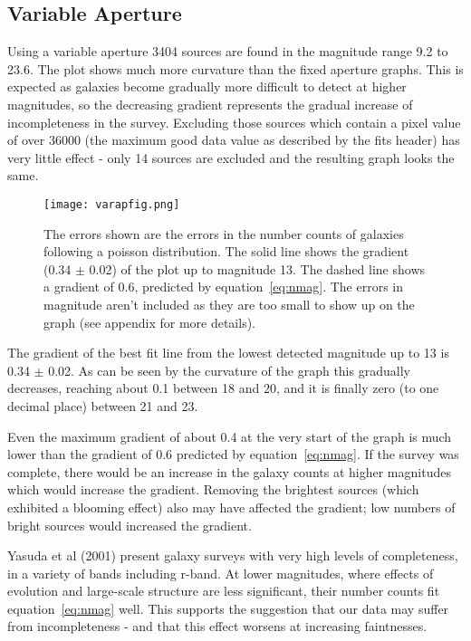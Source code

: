 \documentclass[a4paper,11pt,twoside]{article}
\begin{document}
\newpage
\subsection{Variable Aperture}

Using a variable aperture 3404 sources are found in the
magnitude range 9.2 to 23.6.
The plot shows much more curvature 
than the fixed aperture graphs. This is expected as galaxies 
become gradually more difficult to detect at higher magnitudes, 
so the decreasing gradient represents the gradual increase of 
incompleteness in the survey. Excluding those sources which 
contain a pixel value of over 36000 (the maximum good data 
value as described by the fits header) has very little 
effect - only 14 sources are excluded and the resulting graph 
looks the same.

\begin{figure}[htb]
  \centering
  \texttt{[image: varapfig.png]}
  \caption{The errors shown are the errors in the number 
counts of galaxies following a poisson distribution. The solid line
shows the gradient (0.34 \(\pm\) 0.02) of the plot up to 
magnitude 13. The dashed line shows a gradient of 0.6, 
predicted by equation~\ref{eq:nmag}. 
The errors in magnitude aren't included as 
they are too small to show up on the graph 
(see appendix for more details).}
  \label{fig:varapfig}
\end{figure}


The gradient of the best fit line from the lowest detected 
magnitude up to 13 is 0.34 \(\pm\) 0.02. 
As can be seen by the curvature of the 
graph this gradually decreases, reaching about 0.1 between 
18 and 20, and it is finally zero (to one decimal place) 
between 21 and 23. 

Even the maximum gradient of about 0.4 at the very start 
of the graph is much lower than the gradient of 0.6 
predicted by equation~\ref{eq:nmag}. If the survey was complete, 
there would be an increase in the galaxy counts at higher magnitudes 
which would increase the gradient. Removing the brightest 
sources (which exhibited a blooming effect) also may have 
affected the gradient; low numbers of bright sources would  
increased the gradient.

Yasuda\cite{yasuda} et al (2001) present galaxy surveys with 
very high levels of completeness, in a variety of bands including 
r-band. At lower magnitudes, where effects of evolution and 
large-scale structure are less significant, their number 
counts fit equation~\ref{eq:nmag} well. This supports the suggestion 
that our data may suffer from incompleteness - and that this 
effect worsens at increasing faintnesses. 
\end{document}
